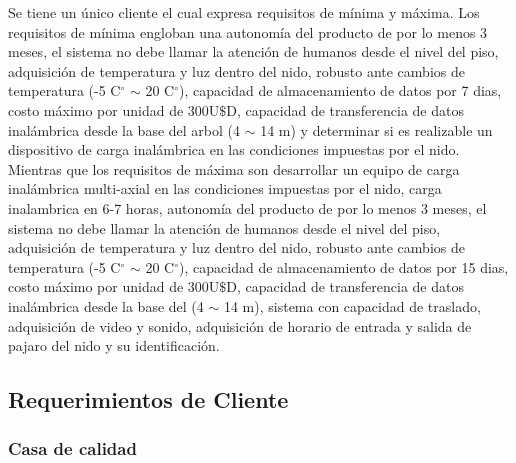 


Se tiene un único cliente el cual expresa requisitos de mínima y máxima. Los requisitos de mínima engloban una autonomía del producto de por lo menos 3 meses, el sistema no debe llamar la atención de humanos desde el nivel del piso, adquisición de temperatura y luz dentro del nido, robusto ante cambios de temperatura (-5 C$^{\circ}$ $\sim$ 20 C$^{\circ}$), capacidad de almacenamiento de datos por 7 dias, costo máximo por unidad de 300U$\$ $D, capacidad de transferencia de datos inalámbrica desde la base del arbol (4 $\sim$ 14 m) y determinar si es realizable un dispositivo de carga inalámbrica en las condiciones impuestas por el nido. Mientras que los requisitos de máxima son 
desarrollar un equipo de carga inalámbrica multi-axial en las condiciones impuestas por el nido, carga inalambrica en 6-7 horas, autonomía del producto de por lo menos 3 meses, el sistema no debe llamar la atención de humanos desde el nivel del piso, adquisición de temperatura y luz dentro del nido, robusto ante cambios de temperatura (-5 C$^{\circ}$ $\sim$ 20 C$^{\circ}$), capacidad de almacenamiento de datos por 15 dias, costo máximo por unidad de 300U$\$ $D, capacidad de transferencia de datos inalámbrica desde la base del   (4 $\sim$ 14 m), sistema con capacidad de traslado, adquisición de video y sonido, adquisición de horario de entrada y salida de pajaro del nido y su identificación.
 

\subsection{Requerimientos de Cliente}
\subsubsection{Casa de calidad}


